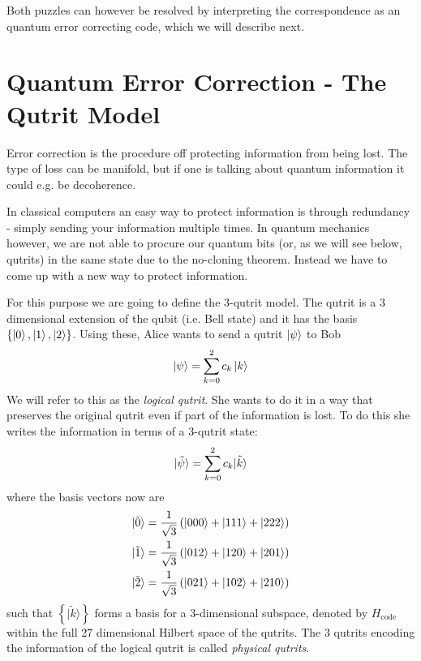 \documentclass[letter,12pt]{article}
\begin{document}
Both puzzles can however be resolved by interpreting the correspondence as an quantum error correcting code, which we will describe next.

\section{Quantum Error Correction - The Qutrit Model}
Error correction is the procedure off protecting information from being lost. The type of loss can be manifold, but if one is talking about quantum information it could e.g. be decoherence. 

In classical computers an easy way to protect information is through redundancy - simply sending your information multiple times. In quantum mechanics however, we are not able to procure our quantum bits (or, as we will see below, qutrits) in the same state due to the no-cloning theorem. Instead we have to come up with a new way to protect information. 

For this purpose we are going to define the 3-qutrit model. The qutrit is a 3 dimensional extension of the qubit (i.e. Bell state) and it has the basis $\{\ket{0},\ket{1},\ket{2}\}$. Using these, Alice wants to send a qutrit $\ket{\psi}$ to Bob
\begin{equation}
	\begin{aligned}
		\ket{\psi}=\sum_{k=0}^{2}c_k \ket{k}
	\end{aligned}
\end{equation}
We will refer to this as the \textit{logical qutrit}. She wants to do it in a way that preserves the original qutrit even if part of the information is lost. To do this she writes the information in terms of a 3-qutrit state:
\begin{equation}
	\begin{aligned}
		|\tilde \psi\rangle=\sum_{k=0}^{2}c_k \tilde{\ket{k}}
	\end{aligned}
\end{equation}
where the basis vectors now are
	\begin{equation} \label{eq:masslessSH}
		\begin{aligned}
			|\tilde 0\rangle &=\frac{1}{\sqrt{3}}\left(\ket{000}+\ket{111}+\ket{222}\right)\\
			|\tilde 1\rangle &=\frac{1}{\sqrt{3}}\left(\ket{012}+\ket{120}+\ket{201}\right)\\
			|\tilde 2\rangle &=\frac{1}{\sqrt{3}}\left(\ket{021}+\ket{102}+\ket{210}\right)\\
		\end{aligned}
	\end{equation}
such that $\left\{|\tilde k\rangle\right\}$ forms a basis for a 3-dimensional subspace, denoted by $H_{\text{code}}$ within the full 27 dimensional Hilbert space of the qutrits. The 3 qutrits encoding the information of the logical qutrit is called \textit{physical qutrits}. 
\end{document}
